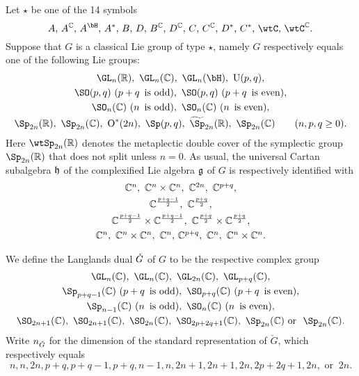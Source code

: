 \documentclass[counting_main.tex]{subfiles}
\begin{document}
Let $\star$ be one of the 14 symbols
\[
  \textrm{ $A$, $A^\C$, $A^\bH$, $A^*$, $B$, $D$, $B^\C$, $D^\C$, $C$, $C^\C$,
    $D^*$, $C^*$, $\wtC$, $\wtC^\C$. }
\]
Suppose that $G$ is a classical Lie group of type $\star$, namely $G$
respectively equals one of the following Lie groups:
\[
  \begin{array}{c}
    \GL_n(\R), \ \GL_n(\C), \  \GL_n(\bH),\  \oU(p,q),\smallskip\\
    \SO(p,q)\ (p+q\, \textrm{ is odd}),  \  \SO(p,q)\  (p+q\, \textrm{ is even}),\smallskip\\
    \SO_n(\C) \ (n\, \textrm{ is odd}),  \
    \SO_n(\C) \ (n\, \textrm{ is even}),\smallskip \\
    \Sp_{2n}(\R), \ \Sp_{2n}(\C), \  \oO^*(2n), \  \Sp(p,q),\   \widetilde \Sp_{2n}(\R), \ \Sp_{2n}(\C) \qquad (n, p, q\geq 0).
  \end{array}
\]
Here $\wtSp_{2n}(\R)$ denotes the metaplectic double cover of the symplectic
group $\Sp_{2n}(\R)$ that does not split unless $n=0$. As usual, the universal
Cartan subalgebra $\mathfrak h$ of the complexified Lie algebra $\mathfrak g$ of $G$ is
respectively identified with
\[
  \begin{array}{c}
    \C^n, \ \C^n\times \C^n, \ \C^{2n},  \ \C^{p+q},\smallskip \\
    \C^{\frac{p+q-1}{2}},\ \C^{\frac{p+q}{2}}, \smallskip \\
    \C^{\frac{p+q-1}{2}}\times \C^{\frac{p+q-1}{2}},\  \C^{\frac{p+q}{2}}\times \C^{\frac{p+q}{2}}, \smallskip \\
    \C^n,\ \C^n\times \C^n, \ \C^n, \, \C^{p+q},   \ \C^n,\ \C^n\times \C^n.
  \end{array}
\]


We define the Langlands dual $\check{G}$ of $G$ to be the respective complex group
\[
  \begin{array}{c}
    \GL_n(\C), \ \GL_n(\C), \  \GL_{2n}(\C),\  \GL_{p+q}(\C),\smallskip\\
    \Sp_{p+q-1}(\C)\ (p+q\, \textrm{ is odd}),  \  \SO_{p+q}(\C)\  (p+q\, \textrm{ is even}),\smallskip\\
    \Sp_{n-1}(\C) \ (n\, \textrm{ is odd}),  \
    \SO_n(\C) \ (n\, \textrm{ is even}),\smallskip \\
    \SO_{2n+1}(\C), \ \SO_{2n+1}(\C), \  \SO_{2n}(\C), \  \SO_{2p+2q+1}(\C),\    \Sp_{2n}(\C) \  \textrm{or } \  \Sp_{2n}(\C).
  \end{array}
\]
Write $n_{\check{G}}$ for the dimension of the standard representation of $\check G$,
which respectively equals
\[
  n, n, 2n, p+q, p+q-1, p+q, n-1, n, 2n+1, 2n+1, 2n, 2p+2q+1, 2n, \textrm{ or
  }\ 2n.
\]
\end{document}
